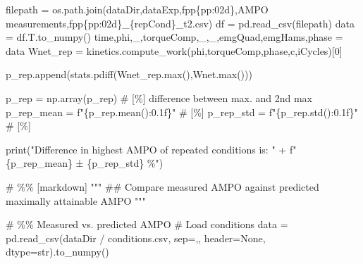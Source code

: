 \documentclass[
  11pt,
  a4paper]{article}
\newenvironment{Shaded}{\begin{snugshade}}{\end{snugshade}}
\newcommand{\BuiltInTok}[1]{\textcolor[rgb]{0.00,0.23,0.31}{#1}}
\newcommand{\CommentTok}[1]{\textcolor[rgb]{0.37,0.37,0.37}{#1}}
\newcommand{\DecValTok}[1]{\textcolor[rgb]{0.68,0.00,0.00}{#1}}
\newcommand{\NormalTok}[1]{\textcolor[rgb]{0.00,0.23,0.31}{#1}}
\newcommand{\OperatorTok}[1]{\textcolor[rgb]{0.37,0.37,0.37}{#1}}
\newcommand{\SpecialCharTok}[1]{\textcolor[rgb]{0.37,0.37,0.37}{#1}}
\newcommand{\SpecialStringTok}[1]{\textcolor[rgb]{0.13,0.47,0.30}{#1}}
\newcommand{\StringTok}[1]{\textcolor[rgb]{0.13,0.47,0.30}{#1}}
\newcommand{\VariableTok}[1]{\textcolor[rgb]{0.07,0.07,0.07}{#1}}
\begin{document}
\begin{Shaded}
\begin{Highlighting}[]
\NormalTok{        filepath }\OperatorTok{=}\NormalTok{ os.path.join(dataDir,}\StringTok{\textquotesingle{}dataExp\textquotesingle{}}\NormalTok{,}\SpecialStringTok{f\textquotesingle{}pp}\SpecialCharTok{\{}\NormalTok{pp}\SpecialCharTok{:02d\}}\SpecialStringTok{\textquotesingle{}}\NormalTok{,}\StringTok{\textquotesingle{}AMPO measurements\textquotesingle{}}\NormalTok{,}\SpecialStringTok{f\textquotesingle{}pp}\SpecialCharTok{\{}\NormalTok{pp}\SpecialCharTok{:02d\}}\SpecialStringTok{\_}\SpecialCharTok{\{}\NormalTok{repCond}\SpecialCharTok{\}}\SpecialStringTok{\_t2.csv\textquotesingle{}}\NormalTok{)}
\NormalTok{        df }\OperatorTok{=}\NormalTok{ pd.read\_csv(filepath)}
\NormalTok{        data }\OperatorTok{=}\NormalTok{ df.T.to\_numpy()}
\NormalTok{        time,phi,\_,torqueComp,\_,\_,emgQuad,emgHams,phase }\OperatorTok{=}\NormalTok{ data}
\NormalTok{        Wnet\_rep }\OperatorTok{=}\NormalTok{ kinetics.compute\_work(phi,torqueComp,phase,}\StringTok{\textquotesingle{}c\textquotesingle{}}\NormalTok{,iCycles)[}\DecValTok{0}\NormalTok{]  }
    
\NormalTok{        p\_rep.append(stats.pdiff(Wnet\_rep.}\BuiltInTok{max}\NormalTok{(),Wnet.}\BuiltInTok{max}\NormalTok{()))}

\NormalTok{p\_rep }\OperatorTok{=}\NormalTok{ np.array(p\_rep) }\CommentTok{\# [\%] difference between max. and 2nd max}
\NormalTok{p\_rep\_mean }\OperatorTok{=} \SpecialStringTok{f"}\SpecialCharTok{\{}\NormalTok{p\_rep}\SpecialCharTok{.}\NormalTok{mean()}\SpecialCharTok{:0.1f\}}\SpecialStringTok{"}  \CommentTok{\# [\%] }
\NormalTok{p\_rep\_std  }\OperatorTok{=} \SpecialStringTok{f"}\SpecialCharTok{\{}\NormalTok{p\_rep}\SpecialCharTok{.}\NormalTok{std()}\SpecialCharTok{:0.1f\}}\SpecialStringTok{"}  \CommentTok{\# [\%] }

\BuiltInTok{print}\NormalTok{(}\StringTok{"Difference in highest AMPO of repeated conditions is: "} \OperatorTok{+}
      \SpecialStringTok{f"}\SpecialCharTok{\{}\NormalTok{p\_rep\_mean}\SpecialCharTok{\}}\SpecialStringTok{ ± }\SpecialCharTok{\{}\NormalTok{p\_rep\_std}\SpecialCharTok{\}}\SpecialStringTok{ \%"}\NormalTok{)}

\CommentTok{\# \%\% [markdown]}
\CommentTok{"""}
\CommentTok{\#\# Compare measured AMPO against predicted maximally attainable AMPO}
\CommentTok{"""}

\CommentTok{\# \%\% Measured vs. predicted AMPO}
\CommentTok{\# Load conditions}
\NormalTok{data }\OperatorTok{=}\NormalTok{ pd.read\_csv(dataDir }\OperatorTok{/} \StringTok{\textquotesingle{}conditions.csv\textquotesingle{}}\NormalTok{, sep}\OperatorTok{=}\StringTok{\textquotesingle{},\textquotesingle{}}\NormalTok{, header}\OperatorTok{=}\VariableTok{None}\NormalTok{, dtype}\OperatorTok{=}\BuiltInTok{str}\NormalTok{).to\_numpy()}


\end{Highlighting}
\end{Shaded}
\end{document}
